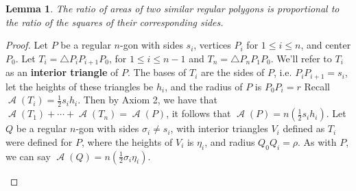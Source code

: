 \documentclass[letterpaper, 12pt]{amsart}
\DeclareMathOperator{\A}{\mathcal{A}}
\newtheorem{lemma}[thm]{Lemma}
\theoremstyle{definition}  %
\begin{document}
		\begin{lemma}
		The ratio of areas of two similar regular polygons is proportional to the ratio of the squares of their corresponding sides.
		\end{lemma}
		\begin{proof}
		Let $P$ be a regular $n$-gon with sides $s_{i}$, vertices $P_{i}$ for $1 \leq i \leq n$, and center $P_{0}$.
		Let $T_{i} = \triangle P_{i}P_{i+1}P_{0}$, for $1 \leq i \leq n - 1$ and $T_{n} = \triangle P_{n}P_{1}P_{0}$.
		We'll refer to $T_{i}$ as an \textbf{interior triangle} of $P$.
		The bases of $T_{i}$ are the sides of $P$, i.e. $P_{i}P_{i+1} = s_{i}$, let the heights of these triangles be $h_{i}$, and the radius of $P$ is $P_{0}P_{i} = r$
		Recall $\A(T_{i}) = \tfrac{1}{2}s_{i}h_{i}$.
		Then by Axiom 2, we have that $\A(T_{1}) + \cdots + \A(T_{n}) = \A(P)$, it follows that $\A(P) = n\left( \tfrac{1}{2}s_{i}h_{i} \right)$.
		Let $Q$ be a regular $n$-gon with sides $\sigma_{i} \neq s_{i}$, with interior triangles $V_{i}$ defined as $T_{i}$ were defined for $P$, where the heights of $V_{i}$ is $\eta_{i}$, and radius $Q_{0}Q_{i} = \rho$.
		As with $P$, we can say $\A(Q) = n(\tfrac{1}{2} \sigma_{i}\eta_{i})$.

		\begin{figure}[b]


\end{figure}
\end{proof}
\end{document}
